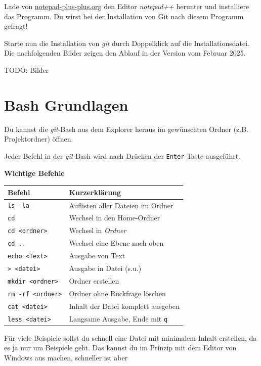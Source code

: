 \documentclass[
  letterpaper,
  DIV=11]{scrreprt}
\newcommand{\key}[1]{\texttt{#1}\xspace}
\newcommand{\git}{\textit{git}\xspace}
\begin{document}
Lade von
\href{https://notepad-plus-plus.org/downloads/}{notepad-plus-plus.org}
den Editor \emph{notepad++} herunter und installiere das Programm. Du
wirst bei der Installation von Git nach diesem Programm gefragt!

Starte nun die Installation von \git durch Doppelklick auf die
Installationsdatei. Die nachfolgenden Bilder zeigen den Ablauf in der
Version vom Februar 2025.

TODO: Bilder

\section{Bash Grundlagen}\label{bash-grundlagen}

Du kannst die \git-Bash aus dem Explorer heraus im gewünschten Ordner
(z.B. Projektordner) öffnen.

Jeder Befehl in der \git-Bash wird nach Drücken der \key{Enter}-Taste
ausgeführt.

\textbf{Wichtige Befehle}

\begin{longtable}[]{@{}ll@{}}
\toprule\noalign{}
Befehl & Kurzerklärung \\
\midrule\noalign{}
\endhead
\bottomrule\noalign{}
\endlastfoot
\texttt{ls\ -la} & Auflisten aller Dateien im Ordner \\
\texttt{cd} & Wechsel in den Home-Ordner \\
\texttt{cd\ \textless{}ordner\textgreater{}} & Wechsel in
\emph{Ordner} \\
\texttt{cd\ ..} & Wechsel eine Ebene nach oben \\
\texttt{echo\ \textless{}Text\textgreater{}} & Ausgabe von Text \\
\texttt{\textgreater{}\ \textless{}datei\textgreater{}} & Ausgabe in
Datei (s.u.) \\
\texttt{mkdir\ \textless{}ordner\textgreater{}} & Ordner erstellen \\
\texttt{rm\ -rf\ \textless{}ordner\textgreater{}} & Ordner ohne
Rückfrage löschen \\
\texttt{cat\ \textless{}datei\textgreater{}} & Inhalt der Datei komplett
ausgeben \\
\texttt{less\ \textless{}datei\textgreater{}} & Langsame Ausgabe, Ende
mit \texttt{q} \\
\end{longtable}

Für viele Beispiele sollst du schnell eine Datei mit minimalem Inhalt
erstellen, da es ja nur um Beispiele geht. Das kannst du im Prinzip mit
dem Editor von Windows aus machen, schneller ist aber
\end{document}
